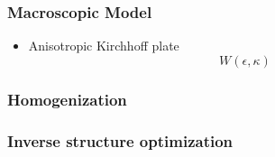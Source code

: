 \documentclass[serif,mathserif, 12pt]{beamer}
\begin{document}
\begin{frame}
  \frametitle{Macroscopic Model}
  \begin{itemize}
  \item Anisotropic Kirchhoff plate
    \begin{equation}
      W(\epsilon, \kappa)
    \end{equation}
  \end{itemize}  
\end{frame}

\begin{frame}
  \frametitle{Homogenization}
  
\end{frame}

\begin{frame}
  \frametitle{}
  
\end{frame}

\begin{frame} 
\end{frame}

\begin{frame}
  \frametitle{Inverse structure optimization}
  
\end{frame}

\begin{frame} 
\end{frame}
\end{document}
